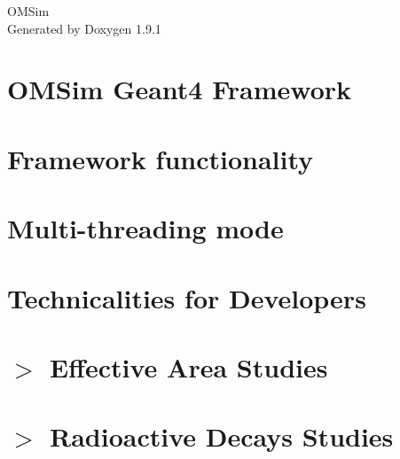 \let\mypdfximage\pdfximage\def\pdfximage{\immediate\mypdfximage}\documentclass[twoside]{book}
\newcommand{\+}{\discretionary{\mbox{\scriptsize$\hookleftarrow$}}{}{}}
\newcommand{\clearemptydoublepage}{%
  \newpage{\pagestyle{empty}\cleardoublepage}%
}
\begin{document}
\raggedbottom

\hypersetup{pageanchor=false,
             bookmarksnumbered=true,
             pdfencoding=unicode
            }
\begin{titlepage}
\vspace*{7cm}
\begin{center}%
{\Large OMSim }\\
\vspace*{1cm}
{\large Generated by Doxygen 1.9.1}\\
\end{center}
\end{titlepage}
\clearemptydoublepage
{}
\tableofcontents
\clearemptydoublepage
{}
\hypersetup{pageanchor=true}

\chapter{OMSim Geant4 Framework}
\label{index}\hypertarget{index}{}
\chapter{Framework functionality}
\label{md_extra_doc_0_common}

\chapter{Multi-\/threading mode}
\label{md_extra_doc_1_multithreading}

\chapter{Technicalities for Developers}
\label{md_extra_doc_2_technicalities}

\chapter{$>$ Effective Area Studies}
\label{md_extra_doc_30_effective_area}

\chapter{$>$ Radioactive Decays Studies}
\label{md_extra_doc_31_radioactive_decays}

\end{document}
